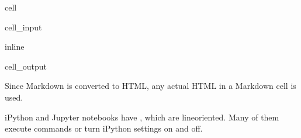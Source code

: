 \documentclass[letterpaper,10pt,english]{jupyterBook}
\begin{document}
\begin{sphinxuseclass}{cell}\begin{sphinxVerbatimInput}

\begin{sphinxuseclass}{cell_input}
\begin{sphinxVerbatim}[commandchars=\\\{\}]
 inline
    
\end{sphinxVerbatim}

\end{sphinxuseclass}\end{sphinxVerbatimInput}
\begin{sphinxVerbatimOutput}

\begin{sphinxuseclass}{cell_output}
\begin{sphinxVerbatim}
\end{sphinxVerbatim}

\noindent{}

\end{sphinxuseclass}\end{sphinxVerbatimOutput}

\end{sphinxuseclass}
\begin{DUlineblock}{0em}
\item[] 
\end{DUlineblock}

\sphinxAtStartPar
Since Markdown is converted to HTML, any actual HTML in a Markdown cell is used.



\begin{DUlineblock}{0em}
\item[] 
\end{DUlineblock}

\sphinxAtStartPar
iPython and Jupyter notebooks have , which are line\sphinxhyphen{}oriented. Many of them execute commands or turn iPython settings on and off.
\end{document}
